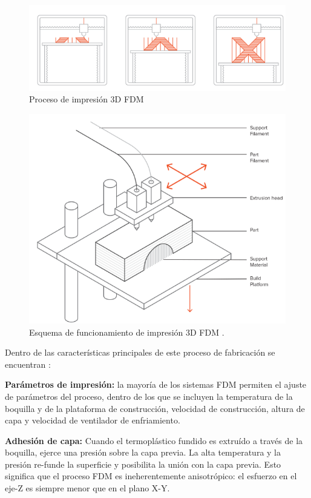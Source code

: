 \begin{figure}[h]
\centering
\includegraphics[scale=0.8]{images/fdmprocess.png}
\caption{Proceso de impresión 3D FDM \citep{bournias2017} }
\end{figure}

\begin{figure}[H]
\centering
\includegraphics[scale=0.6]{images/fdmesquema.png}
\caption{Esquema de funcionamiento de impresión 3D FDM \citep{bournias2017}.}
\end{figure}
\pagebreak

Dentro de las características principales de este proceso de fabricación se encuentran \citep{bournias2017}:

\begin{description}
\item \textbf{Parámetros de impresión:} la mayoría de los sistemas FDM permiten el ajuste de parámetros del proceso, dentro de los que se incluyen la temperatura de la boquilla y de la plataforma de construcción, velocidad de construcción, altura de capa y velocidad de ventilador de enfriamiento.
\end{description}
\begin{description}
\item \textbf{Adhesión de capa:} Cuando el termoplástico fundido es extruído a través de la boquilla, ejerce una presión sobre la capa previa. La alta temperatura y la presión re-funde la superficie y posibilita la unión con la capa previa. Esto significa que el proceso FDM es ineherentemente anisotrópico: el esfuerzo en el eje-Z es siempre menor que en el plano X-Y.
\end{description}

